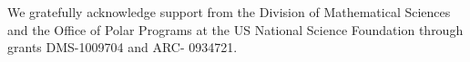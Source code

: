 \documentclass[english,12pt,jmp,graphicx]{revtex4-1}
\begin{document}
%

\begin{acknowledgments}
We gratefully acknowledge support from the Division of Mathematical Sciences and the Office of
Polar Programs at the US National Science Foundation through grants DMS-1009704 and ARC-
0934721.
\end{acknowledgments}


\end{document}
